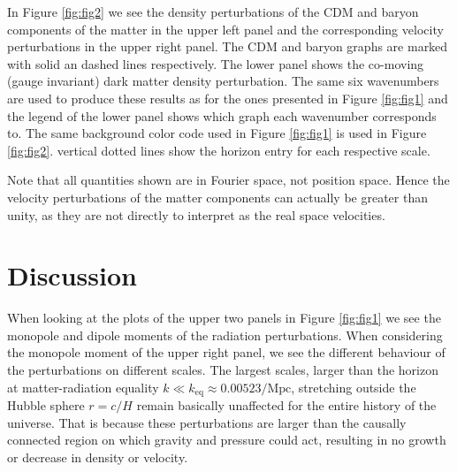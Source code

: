 \documentclass[twocolumn]{aastex62}
\begin{document}
In Figure \ref{fig:fig2} we see the density perturbations of the CDM and baryon components of the matter in the upper left panel and the corresponding velocity perturbations in the upper right panel. The CDM and baryon graphs are marked with solid an dashed lines respectively. The lower panel shows the co-moving (gauge invariant) dark matter density perturbation. The same six wavenumbers are used to produce these results as for the ones presented in Figure \ref{fig:fig1} and the legend of the lower panel shows which graph each wavenumber corresponds to. The same background color code used in Figure \ref{fig:fig1} is used in Figure \ref{fig:fig2}. vertical dotted lines show the horizon entry for each respective scale.

Note that all quantities shown are in Fourier space, not position space. Hence the velocity perturbations of the matter components can actually be greater than unity, as they are not directly to interpret as the real space velocities.

\section{Discussion}\label{sec:Discussion}
When looking at the plots of the upper two panels in Figure \ref{fig:fig1} we see the monopole and dipole moments of the radiation perturbations. When considering the monopole moment of the upper right panel, we see the different behaviour of the perturbations on different scales. The largest scales, larger than the horizon at matter-radiation equality $k\ll k_\text{eq} \approx 0.00523 /\mathrm{Mpc}$, stretching outside the Hubble sphere $r = c/H$ remain basically unaffected for the entire history of the universe. That is because these perturbations are larger than the causally connected region on which gravity and pressure could act, resulting in no growth or decrease in density or velocity.
\end{document}
